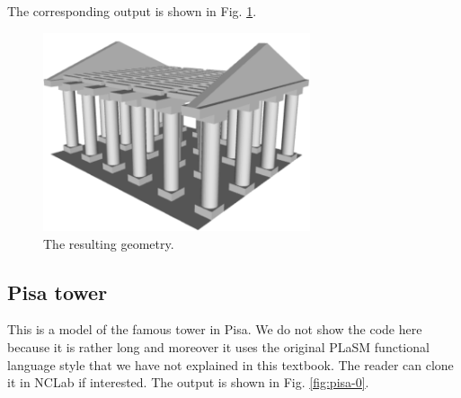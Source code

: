 The corresponding output is shown in Fig. \ref{fig:temple}.
\newpage
\begin{figure}[!ht]
\begin{center}
\includegraphics[width=0.7\textwidth]{img/temple.png}
\end{center}
\vspace{-4mm}
\caption{The resulting geometry.}
\label{fig:temple}
\end{figure}
\noindent

\subsection{Pisa tower}

This is a model of the famous tower in Pisa. We do not show the code here 
because it is rather long and moreover it uses the original PLaSM functional
language style that we have not explained in this textbook. 
The reader can clone it in NCLab if interested. The output 
is shown in Fig. \ref{fig:pisa-0}.

